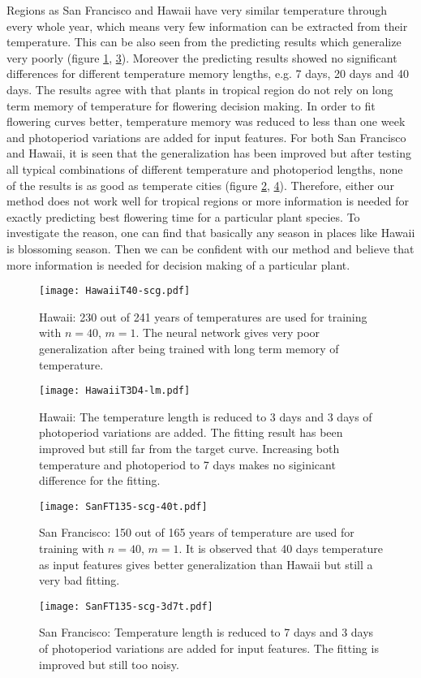 \documentclass[paper=a4, fontsize=12pt]{scrartcl}	%
\numberwithin{equation}{section}					%
\numberwithin{figure}{section}					%
\numberwithin{table}{section}					%
\begin{document}
Regions as San Francisco and Hawaii have very similar temperature through every whole year, which means very few information can be extracted from their temperature. This can be also seen from the predicting results which generalize very poorly (figure \ref{fig:HawaiiT}, \ref{fig:sanT}). Moreover the predicting results showed no significant differences for different temperature memory lengths, e.g. 7 days, 20 days and 40 days. The results agree with that plants in tropical region do not rely on long term memory of temperature for flowering decision making. In order to fit flowering curves better, temperature memory was reduced to less than one week and photoperiod variations are added for input features. For both San Francisco and Hawaii, it is seen that the generalization has been improved but after testing all typical combinations of different temperature and photoperiod lengths, none of the results is as good as temperate cities (figure \ref{fig:HawaiiTD}, \ref{fig:sanTD}). Therefore, either our method does not work well for tropical regions or more information is needed for exactly predicting best flowering time for a particular plant species. To investigate the reason, one can find that basically any season in places like Hawaii is blossoming season. Then we can be confident with our method and believe that more information is needed for decision making of a particular plant. 
\begin{figure}[H]
\centering
\texttt{[image: HawaiiT40-scg.pdf]}
\caption{Hawaii: 230 out of 241 years of temperatures are used for training with $n=40$, $m=1$. The neural network gives very poor generalization after being trained with long term memory of temperature. }
\label{fig:HawaiiT}
\end{figure}
\begin{figure}[H]
\centering
\texttt{[image: HawaiiT3D4-lm.pdf]}
\caption{Hawaii: The temperature length is reduced to 3 days and 3 days of photoperiod variations are added. The fitting result has been improved but still far from the target curve. Increasing both temperature and photoperiod to 7 days makes no siginicant difference for the fitting.}
\label{fig:HawaiiTD}
\end{figure}


\begin{figure}[H]
\centering
\texttt{[image: SanFT135-scg-40t.pdf]}
\caption{San Francisco: 150 out of 165 years of temperature are used for training with $n =40$, $m=1$. It is observed that 40 days temperature as input features gives better generalization than Hawaii but still a very bad fitting.}
\label{fig:sanT}
\end{figure}
\begin{figure}[H]
\centering
\texttt{[image: SanFT135-scg-3d7t.pdf]}
\caption{San Francisco: Temperature length is reduced to 7 days and 3 days of photoperiod variations are added for input features. The fitting is improved but still too noisy. }
\label{fig:sanTD}
\end{figure}
\end{document}
